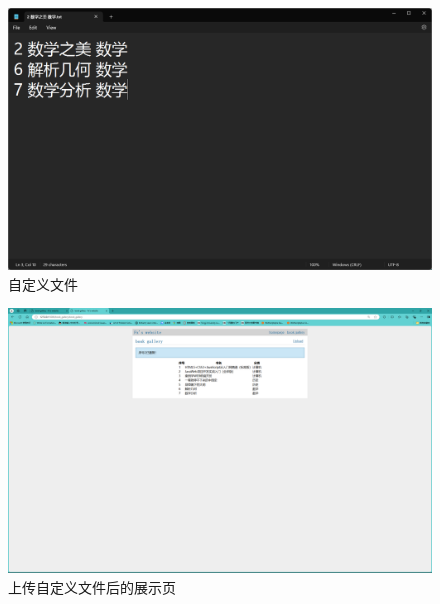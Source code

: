 \begin{figure}[!htbp]
    \centering
    \includegraphics[width=\textwidth]{figures/my_file.png}
    \caption{自定义文件}\label{my_file}
\end{figure}
\begin{figure}[!htbp]
    \centering
    \includegraphics[width=\textwidth]{figures/upload_twice.png}
    \caption{上传自定义文件后的展示页}\label{upload_twice}
\end{figure}

